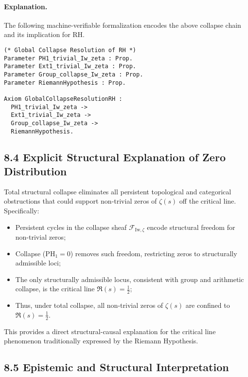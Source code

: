 \documentclass[11pt]{article}
\begin{document}
\paragraph{Explanation.}  
The following machine-verifiable formalization encodes the above collapse chain and its implication for RH.

\begin{lstlisting}[language=Coq]
(* Global Collapse Resolution of RH *)
Parameter PH1_trivial_Iw_zeta : Prop.
Parameter Ext1_trivial_Iw_zeta : Prop.
Parameter Group_collapse_Iw_zeta : Prop.
Parameter RiemannHypothesis : Prop.

Axiom GlobalCollapseResolutionRH :
  PH1_trivial_Iw_zeta ->
  Ext1_trivial_Iw_zeta ->
  Group_collapse_Iw_zeta ->
  RiemannHypothesis.
\end{lstlisting}

\subsection*{8.4 Explicit Structural Explanation of Zero Distribution}

Total structural collapse eliminates all persistent topological and categorical obstructions that could support non-trivial zeros of $\zeta(s)$ off the critical line. Specifically:

\begin{itemize}
    \item Persistent cycles in the collapse sheaf $\mathcal{F}_{\mathrm{Iw}, \zeta}$ encode structural freedom for non-trivial zeros;
    \item Collapse ($\mathrm{PH}_1 = 0$) removes such freedom, restricting zeros to structurally admissible loci;
    \item The only structurally admissible locus, consistent with group and arithmetic collapse, is the critical line $\Re(s) = \tfrac{1}{2}$;
    \item Thus, under total collapse, all non-trivial zeros of $\zeta(s)$ are confined to $\Re(s) = \tfrac{1}{2}$.
\end{itemize}

This provides a direct structural-causal explanation for the critical line phenomenon traditionally expressed by the Riemann Hypothesis.

\subsection*{8.5 Epistemic and Structural Interpretation}
\end{document}
